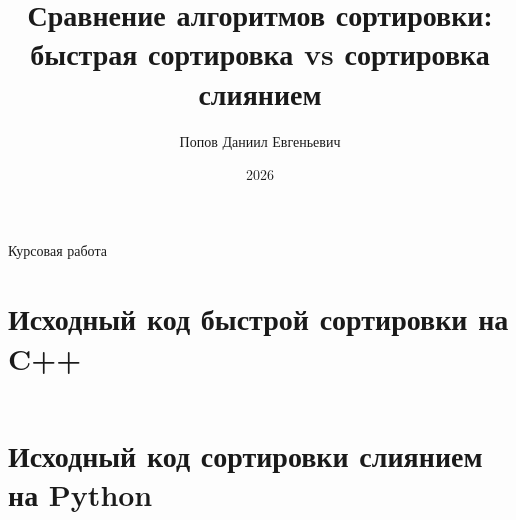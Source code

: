 \documentclass[coursework,bachelor,och]{SCWorks}
\begin{document}

\title{Сравнение алгоритмов сортировки: быстрая сортировка vs сортировка слиянием}




\begin{center}
Курсовая работа
\end{center}

\author{Попов Даниил Евгеньевич}



\begin{centre}
\date{2026}
\end{centre}

\maketitle

\secNumbering

\tableofcontents

\intro








\conclusion


\nocite{*}



\appendix

\section{Исходный код быстрой сортировки на C++}
\label{app:quicksort}

\inputminted{cpp}{code/quicksort.cpp}

\section{Исходный код сортировки слиянием на Python}
\label{app:mergesort}

\inputminted{python}{code/mergesort.py}
\end{document}
